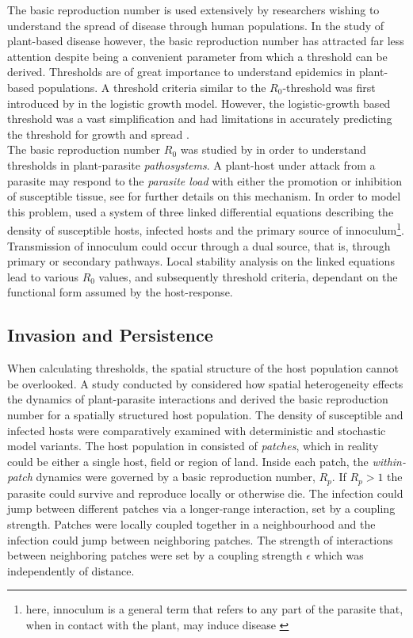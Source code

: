 The basic reproduction number is used extensively by researchers wishing to understand the spread of disease through human populations. In the study of plant-based disease however, the basic reproduction number has attracted far less attention despite being a convenient parameter from which a threshold can be derived. Thresholds are of great importance to understand epidemics in plant-based populations. A threshold criteria similar to the $R_0$-threshold was first introduced by \cite{van2013plant} in the logistic growth model. However, the logistic-growth based threshold was a vast simplification and had limitations in accurately predicting the threshold for growth and spread \cite{onstad1992evaluation}.\\

The basic reproduction number $R_0$ was studied by \cite{gubbins2000population} in order to understand thresholds in plant-parasite \textit{pathosystems}. A plant-host under attack from a parasite may respond to the \textit{parasite load} with either the promotion or inhibition of susceptible tissue, see \cite{gilligan1997analysis} for further details on this mechanism. In order to model this problem, \cite{gubbins2000population} used a system of three linked differential equations describing the density of susceptible hosts, infected hosts and the primary source of innoculum\footnote{\textemdash here, innoculum is a general term that refers to any part of the parasite that, when in contact with the plant, may induce disease \cite{agrios2005chapter}}. Transmission of innoculum could occur through a dual source, that is, through primary or secondary pathways. Local stability analysis on the linked equations lead to various $R_0$ values, and subsequently threshold criteria, dependant on the functional form assumed by the host-response.\\


\subsection{Invasion and Persistence}

When calculating thresholds, the spatial structure of the host population cannot be overlooked. A study conducted by \cite{park2001invasion} considered how spatial heterogeneity effects the dynamics of plant-parasite interactions and derived the basic reproduction number for a spatially structured host population. The density of susceptible and infected hosts were comparatively examined with deterministic and stochastic model variants. The host population in \cite{park2001invasion} consisted of \textit{patches}, which in reality could be either a single host, field or region of land. Inside each patch, the \textit{within-patch} dynamics were governed by a basic reproduction number, $R_p$. If $R_p > 1$ the parasite could survive and reproduce locally or otherwise die. The infection could jump between different patches via a longer-range interaction, set by a coupling strength. Patches were locally coupled together in a neighbourhood and the infection could jump between neighboring patches. The strength of interactions between neighboring patches were set by a coupling strength $\epsilon$ which was independently of distance.\\

